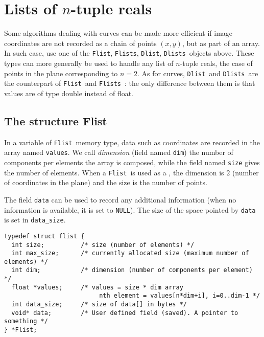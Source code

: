 \section{Lists of $n$-tuple reals}



\def\flist{{\tt Flist}}
\def\flists{{\tt Flists}}
\def\dlist{{\tt Dlist}}
\def\dlists{{\tt Dlists}}

Some algorithms dealing with curves can be made more efficient if image coordinates
are not recorded as a chain of points $(x,y)$, but as part of an array.
In such case, use one of the \flist, \flists, \dlist, \dlists\ objects above.
These types can more generally be used to handle any list of $n$-tuple reals, the
case of points in the plane corresponding to $n=2$.
As for curves, \dlist\ and \dlists\ are the counterpart of \flist\ and \flists\ :
the only difference between them is that values are of type double instead of float.

\subsection{The structure Flist}
\label{curves-polygons_flist}

In a variable of \flist\index{structure!\flist}\ memory type, data such as coordinates are
recorded in the array named \verb+values+.
We call {\em dimension} (field named \verb+dim+) the number of
components per elements the array is composed, while the field
named \verb+size+ gives the number of elements.
When a \flist\ is used as a \fcurve, the dimension is $2$ (number of coordinates
in the plane) and the size is the number of points.

The field \verb+data+ can be used to record any additional information
(when no information is available, it is set to \verb+NULL+).
The size of the space pointed by \verb+data+ is set in \verb+data_size+.

{\small
\begin{verbatim}
typedef struct flist {
  int size;          /* size (number of elements) */
  int max_size;      /* currently allocated size (maximum number of elements) */ 
  int dim;           /* dimension (number of components per element) */
  float *values;     /* values = size * dim array
                          nth element = values[n*dim+i], i=0..dim-1 */
  int data_size;     /* size of data[] in bytes */
  void* data;        /* User defined field (saved). A pointer to something */
} *Flist;
\end{verbatim}
}

